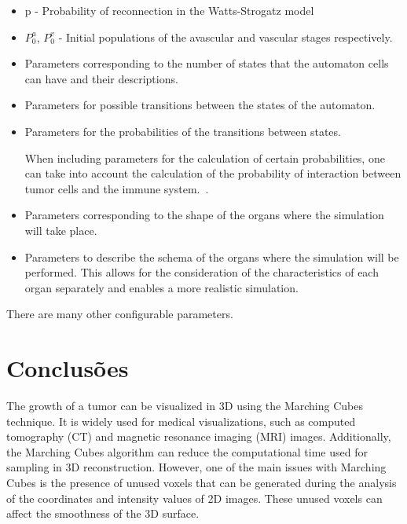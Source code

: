 \documentclass[a4paper,11pt]{article}
\begin{document}
{\begin{itemize}
    The ranges of values for the spatial components of the graph vertices are as follows: $0 \leq x \leq S_{x}$, $0 \leq y \leq S_{y}$ y $0 \leq z \leq S_{z}$.

    \item p - Probability of reconnection in the Watts-Strogatz model
    \item $P_0^a$, $P_0^v$ - Initial populations of the avascular and vascular stages respectively.
    ~\cite{7}
    \item Parameters corresponding to the number of states that the automaton cells can have and their descriptions.
    \item Parameters for possible transitions between the states of the automaton.
    \item Parameters for the probabilities of the transitions between states.
    
    When including parameters for the calculation of certain probabilities, one can take into account the calculation of the probability of interaction between tumor cells and the immune system.~\cite{6}.
    \item Parameters corresponding to the shape of the organs where the simulation will take place.
    \item Parameters to describe the schema of the organs where the simulation will be performed. This allows for the consideration of the characteristics of each organ separately and enables a more realistic simulation.
\end{itemize}

There are many other configurable parameters.\\


\section*{Conclusões}

The growth of a tumor can be visualized in 3D using the Marching Cubes technique. It is widely used for medical visualizations, such as computed tomography (CT) and magnetic resonance imaging (MRI) images. Additionally, the Marching Cubes algorithm can reduce the computational time used for sampling in 3D reconstruction. However, one of the main issues with Marching Cubes is the presence of unused voxels that can be generated during the analysis of the coordinates and intensity values of 2D images. These unused voxels can affect the smoothness of the 3D surface.~\cite{8}

}
\end{document}
